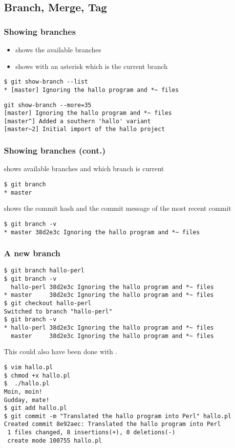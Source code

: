 \subsection{Branch, Merge, Tag}
\begin{frame}[fragile]
\frametitle{Showing branches}
\begin{itemize}
\item shows the available branches
\item shows with an asterisk \ttalert{*} which is the current branch
\end{itemize}
\begin{lstlisting}
$ git show-branch --list
* [master] Ignoring the hallo program and *~ files
\end{lstlisting}

\begin{lstlisting}
git show-branch --more=35
[master] Ignoring the hallo program and *~ files
[master^] Added a southern 'hallo' variant
[master~2] Initial import of the hallo project
\end{lstlisting}
\end{frame}

\begin{frame}[fragile]
    \frametitle{Showing branches (cont.)}
 shows available branches and which branch is current
\begin{lstlisting}
$ git branch
* master
\end{lstlisting}
 shows the commit hash and the commit message of the
most recent commit
\begin{lstlisting}
$ git branch -v
* master 38d2e3c Ignoring the hallo program and *~ files
\end{lstlisting}
\end{frame}

\begin{frame}[fragile]
\frametitle{A new branch}
\begin{lstlisting}[basicstyle=\tiny\ttfamily\color{black}]
$ git branch hallo-perl
$ git branch -v
  hallo-perl 38d2e3c Ignoring the hallo program and *~ files
* master     38d2e3c Ignoring the hallo program and *~ files
$ git checkout hallo-perl
Switched to branch "hallo-perl"
$ git branch -v
* hallo-perl 38d2e3c Ignoring the hallo program and *~ files
  master     38d2e3c Ignoring the hallo program and *~ files
\end{lstlisting}
This could also have been done with .

\begin{lstlisting}[basicstyle=\tiny\ttfamily\color{black}]
$ vim hallo.pl
$ chmod +x hallo.pl
$  ./hallo.pl 
Moin, moin!
Gudday, mate!
$ git add hallo.pl
$ git commit -m "Translated the hallo program into Perl" hallo.pl
Created commit 8e92aec: Translated the hallo program into Perl
 1 files changed, 8 insertions(+), 0 deletions(-)
 create mode 100755 hallo.pl
\end{lstlisting}
\end{frame}

